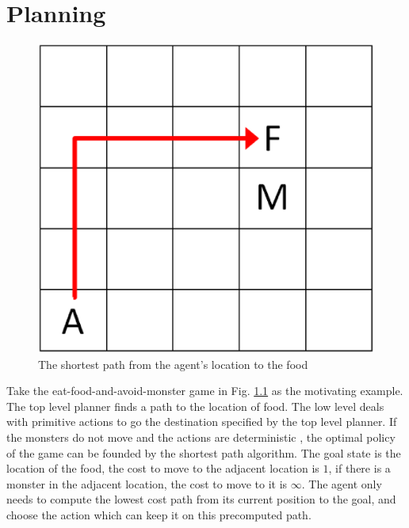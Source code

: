 \chapter{Planning}

\begin{figure}[h]
    \centering
    \begin{minipage}[t]{0.6\linewidth}
        \centering
        \includegraphics[width=\textwidth] {./figures/monsterPlan.eps}
    \end{minipage}
    \caption{The shortest path from the agent's location to the food}
    \label{fig:MonsterPlan}
\end{figure}

Take the eat-food-and-avoid-monster game in Fig. \ref{fig:MonsterPlan} as the motivating example. 
The top level planner finds a path to the location of food. 
The low level deals with primitive actions to go the destination specified by the top level planner.
If the monsters do not move and the actions are deterministic
, the optimal policy of the game can be founded by the shortest path algorithm. The goal state is the location of the food,
the cost to move to the adjacent location is $1$, if there is a monster in the adjacent location, the cost 
to move to it is $\infty$. The agent only needs to compute the lowest cost path from its current position to the goal,
and choose the action which can keep it on this precomputed path.

